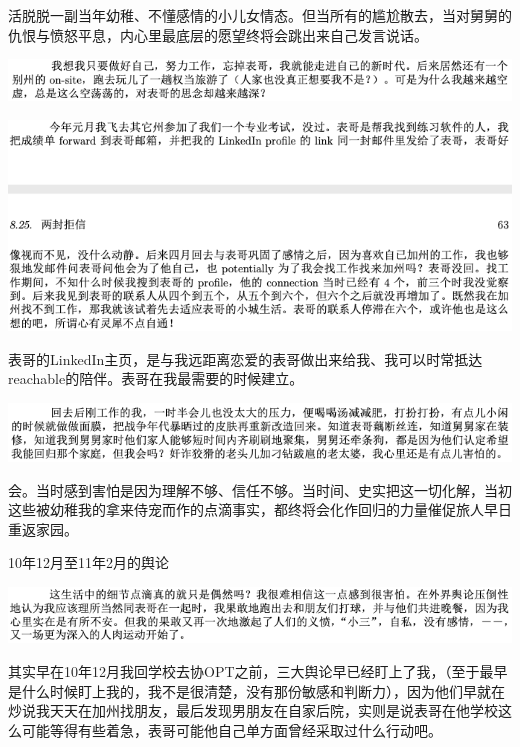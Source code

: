 \documentclass[9pt, b5paper]{article}
\begin{document}
活脱脱一副当年幼稚、不懂感情的小儿女情态。但当所有的尴尬散去，当对舅舅的仇恨与愤怒平息，内心里最底层的愿望终将会跳出来自己发言说话。

\begin{center}
\includegraphics[width=.9\linewidth]{./pic/p1p69-3.png}
\end{center}

\begin{center}
\includegraphics[width=.9\linewidth]{./pic/p1p63-1.png}
\end{center}

表哥的LinkedIn主页，是与我远距离恋爱的表哥做出来给我、我可以时常抵达reachable的陪伴。表哥在我最需要的时候建立。

\begin{center}
\includegraphics[width=.9\linewidth]{./pic/p1p69-2.png}
\end{center}

会。当时感到害怕是因为理解不够、信任不够。当时间、史实把这一切化解，当初这些被幼稚我的拿来侍宠而作的点滴事实，都终将会化作回归的力量催促旅人早日重返家园。 

10年12月至11年2月的舆论

\begin{center}
\includegraphics[width=.9\linewidth]{./pic/p1p46-2.png}
\end{center}

其实早在10年12月我回学校去协OPT之前，三大舆论早已经盯上了我，（至于最早是什么时候盯上我的，我不是很清楚，没有那份敏感和判断力），因为他们早就在炒说我天天在加州找朋友，最后发现男朋友在自家后院，实则是说表哥在他学校这么可能等得有些着急，表哥可能他自己单方面曾经采取过什么行动吧。 
\end{document}
